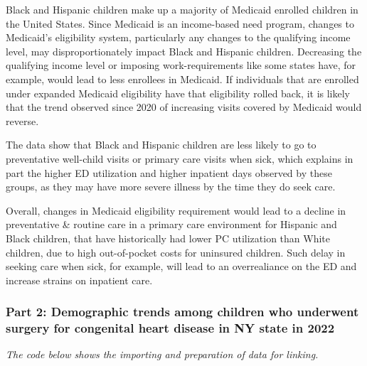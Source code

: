 \documentclass[
]{article}
\begin{document}
Black and Hispanic children make up a majority of Medicaid enrolled
children in the United States. Since Medicaid is an income-based need
program, changes to Medicaid's eligibility system, particularly any
changes to the qualifying income level, may disproportionately impact
Black and Hispanic children. Decreasing the qualifying income level or
imposing work-requirements like some states have, for example, would
lead to less enrollees in Medicaid. If individuals that are enrolled
under expanded Medicaid eligibility have that eligibility rolled back,
it is likely that the trend observed since 2020 of increasing visits
covered by Medicaid would reverse.

The data show that Black and Hispanic children are less likely to go to
preventative well-child visits or primary care visits when sick, which
explains in part the higher ED utilization and higher inpatient days
observed by these groups, as they may have more severe illness by the
time they do seek care.

Overall, changes in Medicaid eligibility requirement would lead to a
decline in preventative \& routine care in a primary care environment
for Hispanic and Black children, that have historically had lower PC
utilization than White children, due to high out-of-pocket costs for
uninsured children. Such delay in seeking care when sick, for example,
will lead to an overrealiance on the ED and increase strains on
inpatient care.

\hypertarget{part-2-demographic-trends-among-children-who-underwent-surgery-for-congenital-heart-disease-in-ny-state-in-2022}{%
\subsubsection{Part 2: Demographic trends among children who underwent
surgery for congenital heart disease in NY state in
2022}\label{part-2-demographic-trends-among-children-who-underwent-surgery-for-congenital-heart-disease-in-ny-state-in-2022}}

\emph{The code below shows the importing and preparation of data for
linking.}
\end{document}
